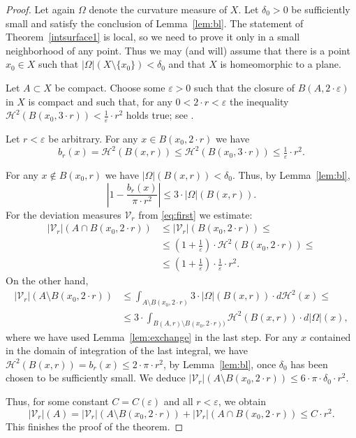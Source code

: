 \documentclass[12pt,leqno,intlimits]{amsart}
\numberwithin{equation}{section}
\theoremstyle{definition}
\theoremstyle{remark}
\newcommand{\tref}[1]{Theorem~\ref{#1}}
\newcommand{\lref}[1]{Lemma~\ref{#1}}
\begin{document}
\begin{proof}
Let again $\Omega$ denote the curvature measure of $X$. Let $\delta _0>0$ be sufficiently small and satisfy the conclusion of \lref{lem:bl}.
The statement of \tref{intsurface1} is local, so we need to prove it only in a small neighborhood of any point.
Thus we may (and will) assume that there is a point $x_0\in X$
such that $| \Omega| (X \setminus \{ x_0 \}) < \delta _0$ and that $X$ is homeomorphic to a plane.

Let $A\subset X$ be  compact. Choose some $\varepsilon >0$ such that the closure of $B (A,{2{\cdot}\varepsilon})$ in $X$ is compact and such that,
for any $0<2{\cdot}r<\varepsilon$ the inequality $\mathcal H^2 (B(x_0,{3{\cdot}r})) < \tfrac 1 {\varepsilon}\cdot r^2$ holds true;  see \cite[Lemma 8.1.1]{Reshetnyak-GeomIV}.

Let $r<\varepsilon$ be arbitrary.
For any $x\in B (x_0,{2{\cdot}r})$ we have
$$  b_r (x) =\mathcal H^2 (B (x,r)) \leq \mathcal H^2 (B (x_0,{3{\cdot}r})) \leq\tfrac 1 {\varepsilon}\cdot r^2. $$


For any $x\notin B (x_0,{r})$ we have $| \Omega |(B(x,r )) < \delta _0$. Thus, by Lemma~\ref{lem:bl}, $$|1-\frac {b_r(x)} {\pi{\cdot}r^2} |
\leq
3\cdot |\Omega | ( B (x,{r})).$$
For the deviation measures $\mathcal{V}_r$ from \eqref{eq:first} we estimate:
\begin{align*}
|\mathcal{V}_r| (A\cap B (x_0,{2{\cdot}r}))
&\leq |\mathcal{V}_r| (B (x_0,{2{\cdot}r})) \leq
\\
&\leq (1+ \tfrac 1 {\varepsilon}) \cdot \mathcal H^2 (B (x_0,{2{\cdot}r})) \leq
\\
&\leq
(1+ \tfrac 1 {\varepsilon}) \cdot \tfrac 1 {\varepsilon} \cdot r^2.
\end{align*}
On the other hand,
\begin{align*}
|\mathcal{V}_r| (A\setminus B (x_0,{2{\cdot}r}))
&\leq
\int _{A \setminus B (x_0,{2{\cdot}r}) } 3 \cdot |\Omega| (B (x,r)) \cdot d\mathcal H^2 (x)
\leq
\\
&\leq 3\cdot \int _{B (A,r)\setminus B (x_0,{2{\cdot}r}))} \mathcal H^2 (B(x,r)) \cdot d|\Omega | (x),
\end{align*}
where we have used \lref{lem:exchange} in the last step.
For any $x$ contained in the domain of integration of the last integral, we have $\mathcal H^2 (B(x,r)) =b_r (x) \leq 2{\cdot}\pi{\cdot}r^2$, by \lref{lem:bl}, once $\delta _0$ has been chosen to be sufficiently small.
We deduce $|\mathcal{V}_r| (A\setminus B (x_0,{2{\cdot}r})) \leq 6 {\cdot}\pi {\cdot}\delta _0 {\cdot} r^2$.

Thus, for some constant $C=C(\varepsilon)$ and all $r<\varepsilon$, we obtain
$$|\mathcal{V}_r|(A)  = |\mathcal{V}_r|  (A\setminus B (x_0,{2{\cdot}r})) + |\mathcal{V}_r| (A\cap B (x_0,{2{\cdot}r}))    \leq C\cdot r^2.$$
This finishes the proof of the theorem.
\end{proof}
\end{document}
